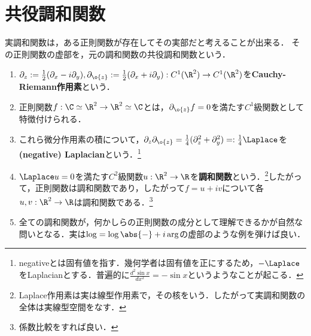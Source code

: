 \documentclass[uplatex, dvipdfmx]{jsreport}
\begin{document}
\section{共役調和関数}

\begin{tcolorbox}[colframe=ForestGreen, colback=ForestGreen!10!white,breakable,colbacktitle=ForestGreen!40!white,coltitle=black,fonttitle=\bfseries\sffamily,
title=]
    実調和関数は，ある正則関数が存在してその実部だと考えることが出来る．
    その正則関数の虚部を，元の調和関数の共役調和関数という．
\end{tcolorbox}

\begin{definition}\mbox{}
    \begin{enumerate}
        \item $\partial_z:=\frac{1}{2}(\partial_x-i\partial_y),\partial_{\o{z}}:=\frac{1}{2}(\partial_x+i\partial_y):C^1(\R^2)\to C^1(\R^2)$を\textbf{Cauchy-Riemann作用素}という．
        \item 正則関数$f:\C\simeq\R^2\to\R^2\simeq\C$とは，$\partial_{\o{z}}f=0$を満たす$C^1$級関数として特徴付けられる．
        \item これら微分作用素の積について，$\partial_z\partial_{\o{z}}=\frac{1}{4}(\partial_z^2+\partial_y^2)=:\frac{1}{4}\Laplace$を\textbf{(negative) Laplacian}という．\footnote{negativeとは固有値を指す．幾何学者は固有値を正にするため，$-\Laplace$をLaplacianとする．普遍的に$\frac{d^2\sin x}{dx^2}=-\sin x$というようなことが起こる．}
        \item $\Laplace u=0$を満たす$C^2$級関数$u:\R^2\to\R$を\textbf{調和関数}という．\footnote{Laplace作用素は実は線型作用素で，その核をいう．したがって実調和関数の全体は実線型空間をなす．}したがって，正則関数は調和関数であり，したがって$f=u+iv$について各$u,v:\R^2\to\R$は調和関数である．\footnote{係数比較をすれば良い．}
        \item 全ての調和関数が，何かしらの正則関数の成分として理解できるかが自然な問いとなる．実は$\log=\log\abs{-}+i\arg$の虚部のような例を弾けば良い．
    \end{enumerate}
\end{definition}
\end{document}
